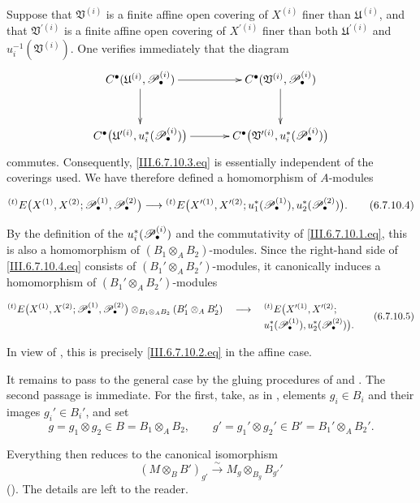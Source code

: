 \begin{env}[6.7.10]
Suppose that $\mathfrak V^{(i)}$ is a finite affine open covering
of $X^{(i)}$ finer than $\mathfrak U^{(i)}$, and that
$\mathfrak V^{\prime(i)}$ is a finite affine open covering of
$X^{\prime(i)}$ finer than both $\mathfrak U^{\prime(i)}$ and
$u_i^{-1}(\mathfrak V^{(i)})$.  One verifies immediately that the
diagram
\[
\xymatrix@C=34pt@R=30pt{
  C^\bullet(\mathfrak U^{(i)},\sh P_\bullet^{(i)})
  \ar[r]\ar[d]
  &
  C^\bullet(\mathfrak V^{(i)},\sh P_\bullet^{(i)})
  \ar[d]
  \\
  C^\bullet
  \bigl(
    \mathfrak U^{\prime(i)},u_i^*(\sh P_\bullet^{(i)})
  \bigr)
  \ar[r]
  &
  C^\bullet
  \bigl(
    \mathfrak V^{\prime(i)},u_i^*(\sh P_\bullet^{(i)})
  \bigr)
}
\]
commutes.  Consequently, \eqref{III.6.7.10.3.eq} is essentially
independent of the coverings used.  We have therefore defined a
homomorphism of $A$-modules
\begin{env}[6.7.10.4]
\label{III.6.7.10.4}
\[
  {}^{(t)}E
  \bigl(
    X^{(1)},X^{(2)};
    \sh P_\bullet^{(1)},\sh P_\bullet^{(2)}
  \bigr)
  \longrightarrow
  {}^{(t)}E
  \bigl(
    X^{\prime(1)},X^{\prime(2)};
    u_1^*(\sh P_\bullet^{(1)}),
    u_2^*(\sh P_\bullet^{(2)})
  \bigr).
  \tag{6.7.10.4}\label{III.6.7.10.4.eq}
\]
\end{env}
By the definition of the $u_i^*(\mathscr{P}_\bullet^{(i)})$ and the
commutativity of \eqref{III.6.7.10.1.eq}, this is also a
homomorphism of $(B_1\otimes_AB_2)$-modules.  Since the right-hand
side of \eqref{III.6.7.10.4.eq} consists of
$(B_1'\otimes_AB_2')$-modules, it canonically induces a
homomorphism of $(B_1'\otimes_AB_2')$-modules
\begin{env}[6.7.10.5]
\label{III.6.7.10.5}
\[
\begin{split}
  {}^{(t)}E
  \bigl(
    X^{(1)},X^{(2)};
    \sh P_\bullet^{(1)},\sh P_\bullet^{(2)}
  \bigr)
  \otimes_{B_1\otimes_AB_2}
  (B_1'\otimes_AB_2')
  \quad\longrightarrow\quad{}&
  {}^{(t)}E
  \bigl(
    X^{\prime(1)},X^{\prime(2)};
\\[-2pt]
    &u_1^*(\sh P_\bullet^{(1)}),
    u_2^*(\sh P_\bullet^{(2)})
  \bigr).
\end{split}
\tag{6.7.10.5}\label{III.6.7.10.5.eq}
\]
\end{env}
In view of , this is precisely
\eqref{III.6.7.10.2.eq} in the affine case.

It remains to pass to the general case by the gluing procedures of
 and .  The second passage is
immediate.  For the first, take, as in , elements
$g_i\in B_i$ and their images $g_i'\in B_i'$, and set
\[
  g=g_1\otimes g_2\in B=B_1\otimes_AB_2,
  \qquad
  g'=g_1'\otimes g_2'\in B'=B_1'\otimes_AB_2'.
\]


Everything then reduces to the canonical isomorphism
\[
  (M\otimes_BB')_{g'}
  \xrightarrow{\sim}
  M_g\otimes_{B_g}B_{g'}'
\]
().  The details are left to the reader.
\end{env}

